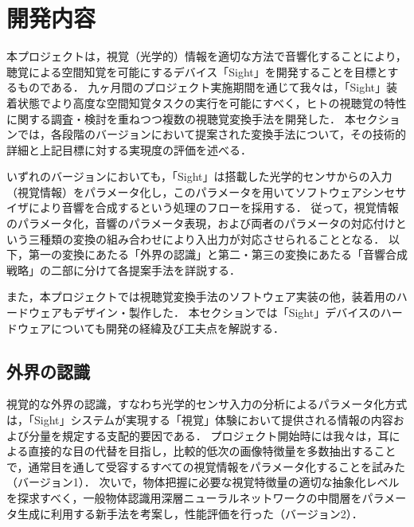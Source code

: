 \section{開発内容}

本プロジェクトは，視覚（光学的）情報を適切な方法で音響化することにより，聴覚による空間知覚を可能にするデバイス「Sight」を開発することを目標とするものである．
九ヶ月間のプロジェクト実施期間を通じて我々は，「Sight」装着状態でより高度な空間知覚タスクの実行を可能にすべく，ヒトの視聴覚の特性に関する調査・検討を重ねつつ複数の視聴覚変換手法を開発した．
本セクションでは，各段階のバージョンにおいて提案された変換手法について，その技術的詳細と上記目標に対する実現度の評価を述べる．

いずれのバージョンにおいても，「Sight」は搭載した光学的センサからの入力（視覚情報）をパラメータ化し，このパラメータを用いてソフトウェアシンセサイザにより音響を合成するという処理のフローを採用する．
従って，視覚情報のパラメータ化，音響のパラメータ表現，および両者のパラメータの対応付けという三種類の変換の組み合わせにより入出力が対応させられることとなる．
以下，第一の変換にあたる「外界の認識」と第二・第三の変換にあたる「音響合成戦略」の二部に分けて各提案手法を詳説する．

また，本プロジェクトでは視聴覚変換手法のソフトウェア実装の他，装着用のハードウェアもデザイン・製作した．
本セクションでは「Sight」デバイスのハードウェアについても開発の経緯及び工夫点を解説する．


\subsection{外界の認識}

視覚的な外界の認識，すなわち光学的センサ入力の分析によるパラメータ化方式は，「Sight」システムが実現する「視覚」体験において提供される情報の内容および分量を規定する支配的要因である．
プロジェクト開始時には我々は，耳による直接的な目の代替を目指し，比較的低次の画像特徴量を多数抽出することで，通常目を通して受容するすべての視覚情報をパラメータ化することを試みた（バージョン1）．
次いで，物体把握に必要な視覚特徴量の適切な抽象化レベルを探求すべく，一般物体認識用深層ニューラルネットワークの中間層をパラメータ生成に利用する新手法を考案し，性能評価を行った（バージョン2）．

